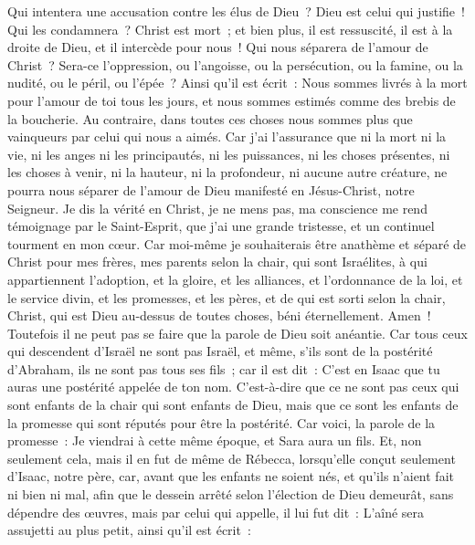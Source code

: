\begin{multicols}{2}
Qui intentera une accusation contre les élus de Dieu~? Dieu est celui qui justifie~!
Qui les condamnera~? Christ est mort~; et bien plus, il est ressuscité, il est à la droite de Dieu, et il intercède pour nous~!
Qui nous séparera de l'amour de Christ~? Sera-ce l'oppression, ou l'angoisse, ou la persécution, ou la famine, ou la nudité, ou le péril, ou l'épée~?
Ainsi qu'il est écrit~: Nous sommes livrés à la mort pour l'amour de toi tous les jours, et nous sommes estimés comme des brebis de la boucherie.
Au contraire, dans toutes ces choses nous sommes plus que vainqueurs par celui qui nous a aimés.
Car j'ai l'assurance que ni la mort ni la vie, ni les anges ni les principautés, ni les puissances, ni les choses présentes, ni les choses à venir,
ni la hauteur, ni la profondeur, ni aucune autre créature, ne pourra nous séparer de l'amour de Dieu manifesté en Jésus-Christ, notre Seigneur.
\VerseOne{}Je dis la vérité en Christ, je ne mens pas, ma conscience me rend témoignage par le Saint-Esprit,
que j'ai une grande tristesse, et un continuel tourment en mon cœur.
Car moi-même je souhaiterais être anathème et séparé de Christ pour mes frères, mes parents selon la chair,
qui sont Israélites, à qui appartiennent l'adoption, et la gloire, et les alliances, et l'ordonnance de la loi, et le service divin,
et les promesses, et les pères, et de qui est sorti selon la chair, Christ, qui est Dieu au-dessus de toutes choses, béni éternellement. Amen~!
Toutefois il ne peut pas se faire que la parole de Dieu soit anéantie. Car tous ceux qui descendent d'Israël ne sont pas Israël,
et même, s'ils sont de la postérité d'Abraham, ils ne sont pas tous ses fils~; car il est dit~: C'est en Isaac que tu auras une postérité appelée de ton nom.
C'est-à-dire que ce ne sont pas ceux qui sont enfants de la chair qui sont enfants de Dieu, mais que ce sont les enfants de la promesse qui sont réputés pour être la postérité.
Car voici, la parole de la promesse~: Je viendrai à cette même époque, et Sara aura un fils.
Et, non seulement cela, mais il en fut de même de Rébecca, lorsqu'elle conçut seulement d'Isaac, notre père,
car, avant que les enfants ne soient nés, et qu'ils n'aient fait ni bien ni mal, afin que le dessein arrêté selon l'élection de Dieu demeurât, sans dépendre des œuvres, mais par celui qui appelle, 
il lui fut dit~: L'aîné sera assujetti au plus petit, ainsi qu'il est écrit~:

\end{multicols}
